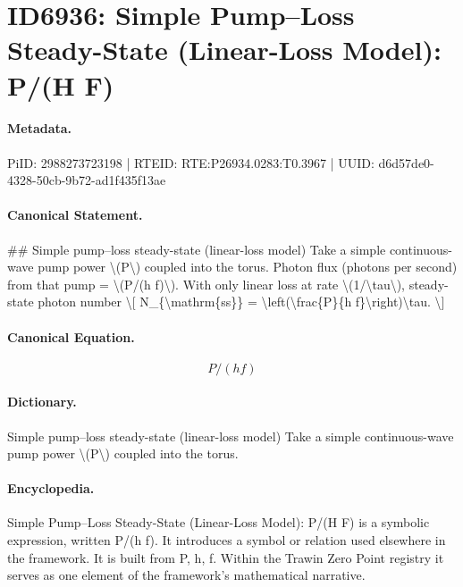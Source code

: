 \section*{ID6936: Simple Pump–Loss Steady-State (Linear-Loss Model): P/(H F)}
\paragraph{Metadata.}
PiID: 2988273723198 | RTEID: RTE:P26934.0283:T0.3967 | UUID: d6d57de0-4328-50cb-9b72-ad1f435f13ae

\paragraph{Canonical Statement.}
\#\# Simple pump–loss steady-state (linear-loss model) Take a simple continuous-wave pump power \textbackslash{}(P\textbackslash{}) coupled into the torus. Photon flux (photons per second) from that pump = \textbackslash{}(P/(h f)\textbackslash{}). With only linear loss at rate \textbackslash{}(1/\textbackslash{}tau\textbackslash{}), steady-state photon number \textbackslash{}[ N\_\{\textbackslash{}mathrm\{ss\}\} = \textbackslash{}left(\textbackslash{}frac\{P\}\{h f\}\textbackslash{}right)\textbackslash{}tau. \textbackslash{}]

\paragraph{Canonical Equation.}
\[
P/(h f)
\]

\paragraph{Dictionary.}
Simple pump–loss steady-state (linear-loss model) Take a simple continuous-wave pump power \textbackslash{}(P\textbackslash{}) coupled into the torus.

\paragraph{Encyclopedia.}
Simple Pump–Loss Steady-State (Linear-Loss Model): P/(H F) is a symbolic expression, written P/(h f). It introduces a symbol or relation used elsewhere in the framework. It is built from P, h, f. Within the Trawin Zero Point registry it serves as one element of the framework's mathematical narrative.

